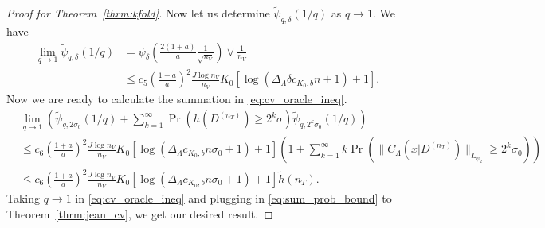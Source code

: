 \documentclass[10pt]{book}
\theoremstyle{definition}
\begin{document}
\begin{proof}[Proof for Theorem~\ref{thrm:kfold}]
	Now let us determine $\tilde{\psi}_{q, \delta}(1/q)$ as $q \rightarrow 1$.
	We have
	\begin{align}
	\lim_{q\rightarrow1}\tilde{\psi}_{q,\delta}(1/q)
	& = \psi_{\delta}\left(\frac{2(1+a)}{a}\frac{1}{\sqrt{n_{V}}}\right)\vee\frac{1}{n_{V}}\\
	& \le
	c_{5} \left (\frac{1+a}{a} \right )^2 \frac{J\log n_{V}}{n_{V}}
	K_0\left[\log\left(\Delta_{\Lambda}\delta c_{K_0, b} n +1\right)+1\right].
	\end{align}
	Now we are ready to calculate the summation in \eqref{eq:cv_oracle_ineq}.
	\begin{align}
	& \lim_{q \rightarrow 1} \left(
	\tilde{\psi}_{q,2\sigma_0}(1/q)
	+\sum_{k=1}^{\infty}
	\Pr\left(h\left(D^{(n_{T})}\right)\ge2^{k}\sigma\right)
	\tilde{\psi}_{q,2^{k}\sigma_0}(1/q)
	\right)
	\\
	& \le
	c_{6} \left (\frac{1+a}{a} \right )^2 \frac{J\log n_{V}}{n_{V}}
	K_0\left[\log\left(\Delta_{\Lambda} c_{K_0, b} n \sigma_0 +1\right)+1\right]
	\left(
	1 + 
	\sum_{k=1}^{\infty}
	k \Pr\left(\|C_\Lambda(x|D^{(n_{T})})\|_{L_{\psi_{2}}} \ge 2^{k} \sigma_0\right)
	\right)
	\\
	& \le
	c_{6} \left (\frac{1+a}{a} \right )^2 \frac{J\log n_{V}}{n_{V}}
	K_0\left[\log\left(\Delta_{\Lambda} c_{K_0, b} n \sigma_0 +1\right)+1\right]
	\tilde{h}(n_{T}).
	\label{eq:sum_prob_bound}
	\end{align}
	Taking $q \rightarrow 1$ in \eqref{eq:cv_oracle_ineq} and plugging in \eqref{eq:sum_prob_bound} to Theorem~\ref{thrm:jean_cv}, we get our desired result.
\end{proof}
\end{document}
